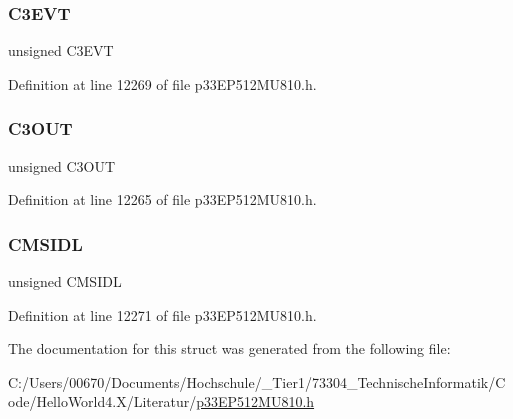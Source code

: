 \subsubsection{\texorpdfstring{C3\+E\+VT}{C3EVT}}
{\footnotesize\ttfamily unsigned C3\+E\+VT}



Definition at line 12269 of file p33\+E\+P512\+M\+U810.\+h.

\mbox{\label{structtag_c_m_s_t_a_t_b_i_t_s_a1168ba74c2f65affe96009728486d762}} 
\subsubsection{\texorpdfstring{C3\+O\+UT}{C3OUT}}
{\footnotesize\ttfamily unsigned C3\+O\+UT}



Definition at line 12265 of file p33\+E\+P512\+M\+U810.\+h.

\mbox{\label{structtag_c_m_s_t_a_t_b_i_t_s_ade32d9beff74e352daa224124b7f49d2}} 
\subsubsection{\texorpdfstring{C\+M\+S\+I\+DL}{CMSIDL}}
{\footnotesize\ttfamily unsigned C\+M\+S\+I\+DL}



Definition at line 12271 of file p33\+E\+P512\+M\+U810.\+h.



The documentation for this struct was generated from the following file\+:\begin{DoxyCompactItemize}
\item 
C\+:/\+Users/00670/\+Documents/\+Hochschule/\+\_\+\+Tier1/73304\+\_\+\+Technische\+Informatik/\+Code/\+Hello\+World4.\+X/\+Literatur/\hyperlink{p33_e_p512_m_u810_8h}{p33\+E\+P512\+M\+U810.\+h}\end{DoxyCompactItemize}
